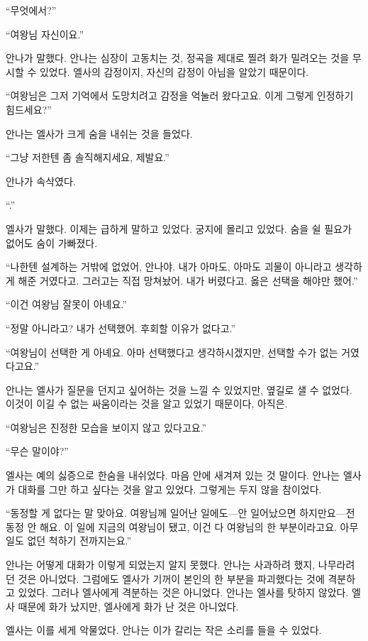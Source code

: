 ``무엇에서?''

``여왕님 자신이요.''

안나가 말했다. 안나는 심장이 고동치는 것, 정곡을 제대로 찔려 화가 밀려오는 것을 무시할 수 있었다. 엘사의 감정이지, 자신의 감정이 아님을 알았기 때문이다.

``여왕님은 그저 기억에서 도망치려고 감정을 억눌러 왔다고요. 이게 그렇게 인정하기 힘드세요?''

안나는 엘사가 크게 숨을 내쉬는 것을 들었다.

``그냥 저한텐 좀 솔직해지세요, 제발요.''

안나가 속삭였다.

``.''

엘사가 말했다. 이제는 급하게 말하고 있었다. 궁지에 몰리고 있었다. 숨을 쉴 필요가 없어도 숨이 가빠졌다.

``나한텐 설계하는 거밖에 없었어, 안나야. 내가 아마도, 아마도 괴물이 아니라고 생각하게 해준 거였다고. 그러고는 직접 망쳐놨어. 내가 버렸다고. 옳은 선택을 해야만 했어.''

``이건 여왕님 잘못이 아녜요.''

``정말 아니라고? 내가 선택했어. 후회할 이유가 없다고.''

``여왕님이 선택한 게 아녜요. 아마 선택했다고 생각하시겠지만, 선택할 수가 없는 거였다고요.''

안나는 엘사가 질문을 던지고 싶어하는 것을 느낄 수 있었지만, 옆길로 샐 수 없었다. 이것이 이길 수 없는 싸움이라는 것을 알고 있었기 때문이다, 아직은.

``여왕님은 진정한 모습을 보이지 않고 있다고요.''

`` 무슨 말이야?''

엘사는 예의 싫증으로 한숨을 내쉬었다. 마음 안에 새겨져 있는 것 말이다. 안나는 엘사가 대화를 그만 하고 싶다는 것을 알고 있었다. 그렇게는 두지 않을 참이었다.

``동정할 게 없다는 말 맞아요. 여왕님께 일어난 일에도—안 일어났으면 하지만요—전 동정 안 해요. 이 일에 지금의 여왕님이 됐고, 이건 다 여왕님의 한 부분이라고요. 아무 일도 없던 척하기 전까지는요.''

안나는 어떻게 대화가 이렇게 되었는지 알지 못했다. 안나는 사과하려 했지, 나무라려던 것은 아니었다. 그럼에도 엘사가 기꺼이 본인의 한 부분을 파괴했다는 것에 격분하고 있었다. 그러나 엘사에게 격분하는 것은 아니었다. 안나는 엘사를 탓하지 않았다. 엘사 때문에 화가 났지만, 엘사에게 화가 난 것은 아니었다.

엘사는 이를 세게 악물었다. 안나는 이가 갈리는 작은 소리를 들을 수 있었다.

